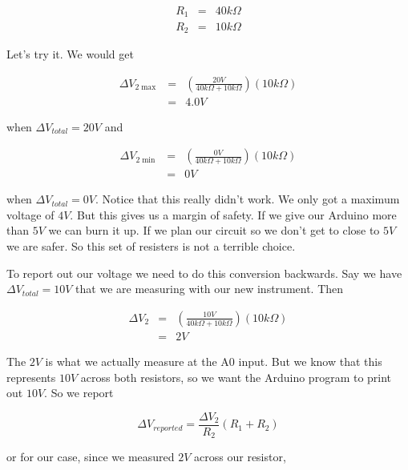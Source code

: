 \begin{eqnarray*}
	R_{1} &=&40\unit{k \Omega} \\
	R_{2} &=&10\unit{k \Omega}
\end{eqnarray*}

\noindent Let's try it. We would get

\begin{eqnarray*}
	\Delta V_{2\max } &=&\left( \frac{20\unit{V}}{40\unit{k \Omega }
	+10\unit{k \Omega }}\right) \left( 10\unit{k \Omega }\right) \\
	&=&4.0\unit{V}
\end{eqnarray*}

\noindent when $\Delta V_{total}=20\unit{V}$ and 

\begin{eqnarray*}
\Delta V_{2\min } &=&\left( \frac{0\unit{V}}{40\unit{k \Omega}
	+10\unit{k\Omega}}\right) \left( 10\unit{k\Omega}\right) \\
	&=&0\unit{V}
\end{eqnarray*}

\noindent when $\Delta V_{total}=0\unit{V}.$ 
Notice that this really didn't work. We
only got a maximum voltage of $4\unit{V}.$ But this gives us a margin of safety. If we give our Arduino more than $5\unit{V}$ we can burn it up. If we plan our circuit so we don't get to close to $5\unit{V}$ we are safer. So this set of resisters is not a terrible choice.

To report out our voltage we need to do this conversion backwards. Say we have $\Delta V_{total}=10\unit{V}$ that we are measuring with our new instrument. Then 

\begin{eqnarray*}
	\Delta V_{2} &=&\left( \frac{10\unit{V}}{40\unit{k \Omega}
	+10\unit{k\Omega}}\right) \left( 10\unit{k\Omega}\right) \\
	&=&2\unit{V}
\end{eqnarray*}

The $2\unit{V}$ is what we actually measure at the A0 input. But we know
that this represents $10\unit{V}$ across both resistors, so we want the
Arduino program to print out $10\unit{V}.$ So we report

\begin{equation*}
	\Delta V_{reported}=\frac{\Delta V_{2}}{R_{2}}\left( R_{1}+R_{2}\right)
\end{equation*}

\noindent or for our case, since we measured $2\unit{V}$ across our resistor,

